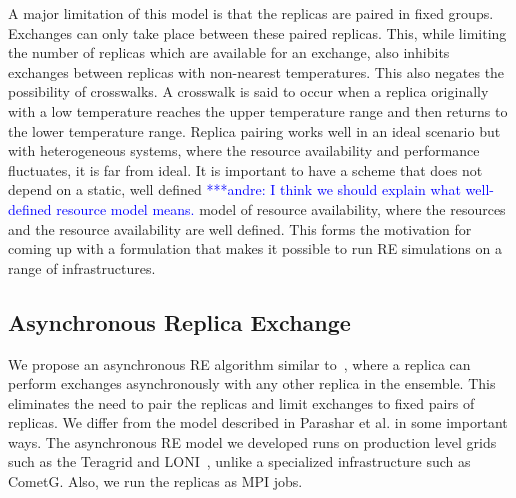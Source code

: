 \documentclass{rspublic}
\newcommand{\jhanote}[1]{ {\textcolor{red} { ***shantenu: #1 }}}
\newcommand{\alnote}[1]{ {\textcolor{blue} { ***andre: #1 }}}
\newcommand{\alnote}[1]{}
\newcommand{\jhanote}[1]{}
\begin{document}
A major limitation of this model is that the replicas are paired in fixed groups. 
Exchanges can only take place between these paired replicas.
This, while limiting the number of replicas which are available for an exchange, also inhibits exchanges between replicas with non-nearest temperatures. This also negates the possibility of crosswalks. A crosswalk is said to occur when a replica originally with a low temperature reaches the upper temperature range and then returns to the lower temperature range. %
Replica pairing works well in an ideal scenario but with heterogeneous systems, 
where the resource availability and performance fluctuates, it is far from ideal. It is 
important to have a scheme that does not depend on a static, well defined \alnote{I think we should explain what well-defined resource model means.}
model of resource availability, where the resources and the resource availability are well defined. This forms the motivation for coming up 
with a formulation that makes it possible to run RE simulations on a range of infrastructures.
  

  
\subsection{Asynchronous Replica Exchange}

We propose an asynchronous RE algorithm similar to~\cite{parashar_arepex},
where a replica can perform exchanges asynchronously with any other replica in the ensemble. This eliminates the need to pair the replicas and limit exchanges to fixed pairs of replicas. We differ from the model described in Parashar et al. in some important ways. The asynchronous RE model we developed runs on production level grids such as the Teragrid and LONI~\cite{LONI_web}, unlike a specialized infrastructure such as CometG. Also, we run the replicas as MPI jobs. 
\end{document}
